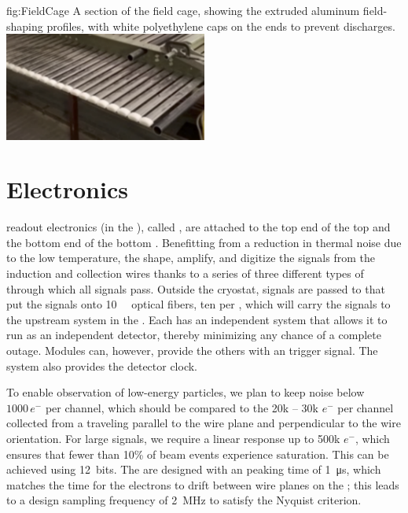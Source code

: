 \begin{dunefigure}{fig:FieldCage}
{A section of the field cage, showing the extruded aluminum field-shaping profiles, with white polyethylene caps on the ends to prevent discharges.}
\includegraphics[width=0.5\textwidth]{graphics/FieldCage.pdf}
\end{dunefigure}

\section{Electronics}
\label{sec:exec-sp-electronics}

 readout electronics (in the ), called , are attached to the top end of the top  and the bottom end of the bottom . 
Benefitting from a reduction in thermal noise due to the low temperature, the   
shape, amplify, and digitize the signals from the  induction and collection wires thanks to a series of three different types of  through which all signals pass. 
Outside the cryostat, signals are passed to  that put the signals onto \SI{10}{\giga\byte} optical fibers, ten per , which will carry the signals to the upstream  system in the . Each  has an independent  system that allows it to run as an independent detector, thereby minimizing any chance of a complete  outage. Modules can, however, provide the others with an  trigger signal. The  system also provides the detector clock. 

To enable observation of low-energy particles, we plan to keep noise below $1000\,e^{-}$ per channel, which should be compared to the 20k -- 30k $e^{-}$ per channel collected from a  traveling parallel to the wire plane and perpendicular to the wire orientation. For large signals, we require a linear response up to 500k $e^{-}$, which ensures that fewer than 10\% of beam events experience saturation. This can be achieved using 12\,  bits. %
The  are designed with an  peaking time of \SI{1}{\micro\second}, which matches the time for the electrons to drift between wire planes on the ; this leads to a design sampling frequency of \SI{2}{\mega\hertz} to satisfy the Nyquist criterion.

